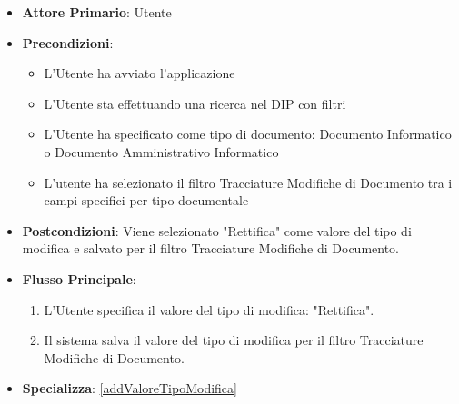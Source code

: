 \begin{itemize}
      \item \textbf{Attore Primario}: Utente
      \item \textbf{Precondizioni}: 
      \begin{itemize}            
            \item L'Utente ha avviato l'applicazione
            \item L'Utente sta effettuando una ricerca nel DIP con filtri
            \item L'Utente ha specificato come tipo di documento: Documento Informatico o Documento Amministrativo Informatico
            \item L'utente ha selezionato il filtro Tracciature Modifiche di Documento tra i campi specifici per tipo documentale
      \end{itemize}
      \item \textbf{Postcondizioni}: Viene selezionato "Rettifica" come valore del tipo di modifica e salvato per il filtro Tracciature Modifiche di Documento.
      \item \textbf{Flusso Principale}:
            \begin{enumerate}
                  \item L'Utente specifica il valore del tipo di modifica: "Rettifica".
                  \item Il sistema salva il valore del tipo di modifica per il filtro Tracciature Modifiche di Documento.
            \end{enumerate}
      \item \textbf{Specializza}: \ref{addValoreTipoModifica}
\end{itemize}

